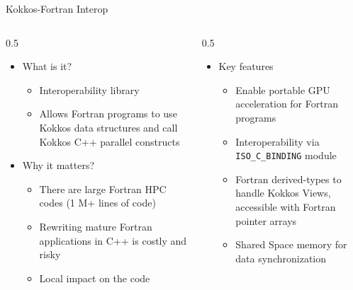 \documentclass[
    aspectratio=169,
    \createHandout
]{beamer}
\begin{document}
\begin{frame}{Kokkos-Fortran Interop}
    \begin{columns}
        \begin{column}{0.5\linewidth}
            \begin{itemize}
                \item What is it?
                \begin{itemize}
                    \item Interoperability library
                    \item Allows Fortran programs to use Kokkos data structures and call Kokkos C++ parallel constructs
                \end{itemize}
                \item Why it matters?
                \begin{itemize}
                    \item There are large Fortran HPC codes (1 M+ lines of code)
                    \item Rewriting mature Fortran applications in C++ is costly and risky
                    \item Local impact on the code
                \end{itemize}
            \end{itemize}
        \end{column}
        \begin{column}{0.5\linewidth}
            \begin{itemize}
                \item Key features
                \begin{itemize}
                    \item Enable portable GPU acceleration for Fortran programs
                    \item Interoperability via \texttt{ISO\_C\_BINDING} module
                    \item Fortran derived-types to handle Kokkos Views, accessible with Fortran pointer arrays
                    \item Shared Space memory for data synchronization
                \end{itemize}
            \end{itemize}
        \end{column}
    \end{columns}
\end{frame}
\end{document}
